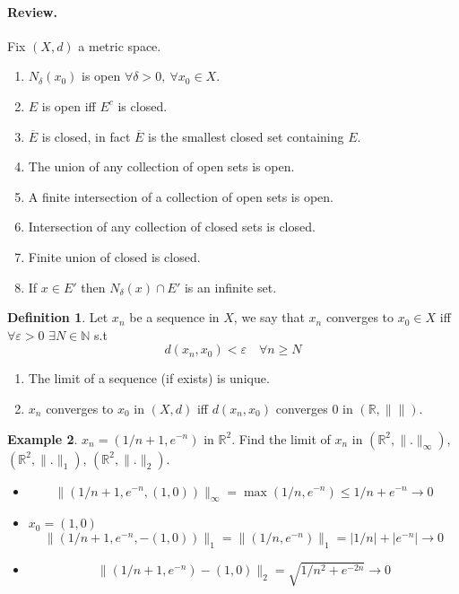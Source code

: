 \documentclass[11pt,a4paper]{article}
\theoremstyle{definition}
\newtheorem{definition}{Definition}[section]
\newtheorem{example}[definition]{Example}
\theoremstyle{plain}
\theoremstyle{remark}
\newcommand{\R}{\mathbb{R}}
\newcommand{\N}{\mathbb{N}}
\newcommand{\norm}[1]{\lVert #1 \rVert}
\begin{document}
\paragraph{Review.} Fix $(X,d)$ a metric space. 
\begin{enumerate}
    \item $N_\delta(x_0)$ is open $\forall \delta > 0, \ \forall x_0 \in X$. 
    \item $E$ is open iff $E^c$ is closed. 
    \item $\overline{E}$ is closed, in fact $\overline{E}$ is the smallest closed set containing $E$. 
    \item The union of any collection of open sets is open. 
    \item A finite intersection of a collection of open sets is open. 
    \item Intersection of any collection of closed sets is closed. 
    \item Finite union of closed is closed.  
    \item If $x \in E'$ then $N_\delta(x) \cap E'$ is an infinite set. 
\end{enumerate} 

\begin{definition}
    Let $x_n$ be a sequence in $X$, we say that $x_n$ converges to $x_0 \in X$ iff $\forall \varepsilon > 0$ $\exists N \in \N$ s.t 
    $$d(x_n, x_0) < \varepsilon \quad \forall n \geq N$$  
\end{definition}

\begin{enumerate}
    \item The limit of a sequence (if exists) is unique. 
    \item $x_n$ converges to $x_0$ in $(X,d)$ iff $d(x_n, x_0)$ converges $0$ in $(\R, \norm{})$. 
\end{enumerate}

\begin{example}
    $x_n = (1/n + 1, e^{-n})$ in $\R^2$. Find the limit of $x_n$ in $(\R^2, \norm{.}_{\infty})$, $(\R^2, \norm{.}_1)$, $(\R^2, \norm{.}_2)$. 
    \begin{itemize}
        \item $$\norm{(1/n + 1, e^{-n}, (1,0))}_{\infty} = \max (1/n, e^{-n}) \leq 1/n + e^{-n} \to 0$$
        \item $x_0 = (1, 0)$ 
        $$\norm{(1/n + 1, e^{-n}, - (1, 0))}_1 = \norm{(1/n, e^{-n})}_1 = |1/n| + |e^{-n}| \to 0$$

        \item $$\norm{(1/n + 1, e^{-n}) - (1,0)}_2 = \sqrt{1/n^2 + e^{-2n}} \to 0$$
    \end{itemize}
\end{example}
\end{document}
